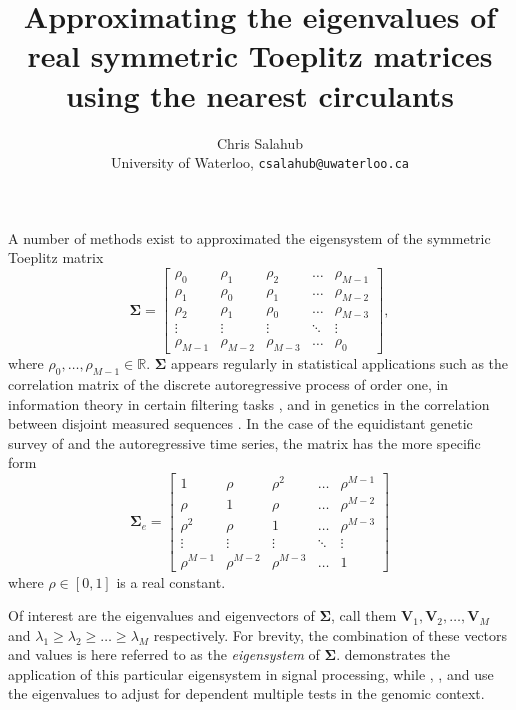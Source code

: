 \documentclass[letterpaper,12pt,oneside,final]{article}
\title{Approximating the eigenvalues of real symmetric Toeplitz matrices using the nearest circulants}
\author{Chris Salahub \\ {\footnotesize University of Waterloo, \texttt{csalahub@uwaterloo.ca}}}
\newcommand{\ve}[1]{\mathbf{#1}}           %
\newcommand{\sm}[1]{\boldsymbol{#1}}   %
\newcommand{\field}[1]{\mathbb{#1}}
\newcommand{\Reals}{\field{R}}
\begin{document}
\maketitle

A number of methods exist to approximated the eigensystem of the symmetric Toeplitz matrix
\begin{equation} \label{eq:multipleTesting:genEigCov}
  \sm{\Sigma} = \begin{bmatrix}
    \rho_0 & \rho_1 & \rho_2 & \dots & \rho_{M-1} \\
    \rho_1 & \rho_0 & \rho_1 & \dots & \rho_{M-2} \\
    \rho_2 & \rho_1 & \rho_0 & \dots & \rho_{M-3} \\
    \vdots & \vdots & \vdots & \ddots & \vdots \\
    \rho_{M-1} & \rho_{M-2} & \rho_{M-3} & \dots & \rho_0
  \end{bmatrix},
\end{equation}
where $\rho_0, \dots, \rho_{M-1} \in \Reals$. $\sm{\Sigma}$ appears regularly in statistical applications such as the correlation matrix of the discrete autoregressive process of order one, in information theory in certain filtering tasks \cite{gray2006toeplitz}, and in genetics in the correlation between disjoint measured sequences \cite{salahub2022correlation}. In the case of the equidistant genetic survey of \cite{LanderBotstein1989} and the autoregressive time series, the matrix has the more specific form
\begin{equation} \label{eq:multipleTesting:specEigCov}
  \sm{\Sigma}_e = \begin{bmatrix}
    1 & \rho & \rho^2 & \dots & \rho^{M-1} \\
    \rho & 1 & \rho & \dots & \rho^{M-2} \\
    \rho^2 & \rho & 1 & \dots & \rho^{M-3} \\
    \vdots & \vdots & \vdots & \ddots & \vdots \\
    \rho^{M-1} & \rho^{M-2} & \rho^{M-3} & \dots & 1
  \end{bmatrix}
\end{equation}
where $\rho \in [0, 1]$ is a real constant.

Of interest are the eigenvalues and eigenvectors of $\sm{\Sigma}$, call them $\ve{V}_1, \ve{V}_2, \dots, \ve{V}_M$ and $\lambda_1 \geq \lambda_2 \geq \dots \geq \lambda_M$ respectively. For brevity, the combination of these vectors and values is here referred to as the \emph{eigensystem} of $\sm{\Sigma}$. \cite{gray2006toeplitz} demonstrates the application of this particular eigensystem in signal processing, while \cite{cheverud2001}, \cite{LiJi2005}, and \cite{Galwey2009} use the eigenvalues to adjust for dependent multiple tests in the genomic context.
\end{document}
